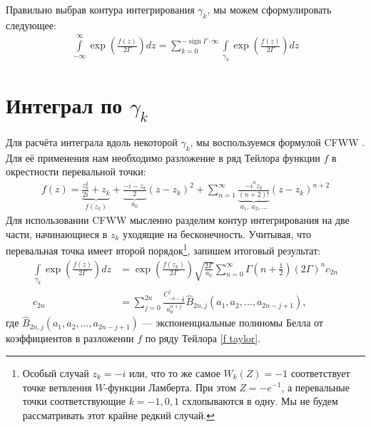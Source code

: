 \documentclass[a4paper, 12pt]{article}
\DeclareMathOperator*{\sign}{sign}
\newenvironment{eqw}{\begin{equation} \begin{aligned}}   
    {\end{aligned}    \end{equation}}
\begin{document}
Правильно выбрав контура интегрирования $\gamma_k$, мы можем сформулировать следующее:
\begin{eqw}\label{contour deformation}
    \int\limits_{-\infty}^{\infty}\exp\left(\frac{f(z)}{2\Gamma}\right) dz = \sum\limits_{k=0}^{-\sign\Gamma \cdot \infty}
    \int\limits_{\gamma_k} \exp\left(\frac{f(z)}{2\Gamma}\right) dz
\end{eqw}
\section*{Интеграл по $\gamma_k$}
Для расчёта интеграла вдоль некоторой $\gamma_k$, мы воспользуемся формулой CFWW \cite{bleistein1975asymptotic}. Для её применения нам необходимо разложение в ряд Тейлора функции $f$ в окрестности перевальной точки:
\begin{eqw}\label{f taylor}
    f(z) = \underbrace{\frac{z_k^2}{2i} + z_k}_{f(z_k)} + \underbrace{\frac{-i-z_k}{2}}_{a_0} (z-z_k)^2 + 
    \sum_{n=1}^{\infty} \underbrace{\frac{-i^n z_k}{(n+2)!}}_{a_1, \: a_2, \dots} (z-z_k)^{n+2}
\end{eqw}
Для использовании CFWW мысленно разделим контур интегрирования на две части, начинающиеся в $z_k$ уходящие на бесконечность. Учитывая, что перевальная точка имеет второй порядок\footnote{Особый случай $z_k = -i$ или, что то же самое $W_k(Z) = -1$ соответствует точке ветвления $W$-функции Ламберта. При этом $Z=-e^{-1}$, а перевальные точки соответствующие $k=-1, 0, 1$ схлопываются в одну. Мы не будем рассматривать этот крайне редкий случай.}, запишем итоговый результат:
\begin{eqw}\label{asymptotic gamma_k int raw}
    \int\limits_{\gamma_k} \exp\left(\frac{f(z)}{2\Gamma}\right) dz 
    &= \exp\left(\frac{ f(z_k)}{2\Gamma} \right)\sqrt{\frac{2\Gamma}{a_0}}\sum\limits_{n=0}^{\infty} 
    \Gamma\left(n+\frac{1}{2}\right)\left(2\Gamma\right)^n c_{2n}\\
    c_{2n} &= \sum\limits_{j=0}^{2n} \frac{C_{-n-\frac{1}{2}}^j}{a_0^{n+j}}\hat{B}_{2n, j}\left(a_1, a_2, \dots, a_{2n-j+1}\right),
\end{eqw}
где $\hat{B}_{2n, j}\left(a_1, a_2, \dots, a_{2n-j+1}\right)$ --- экспоненциальные полиномы Белла от коэффициентов в разложении  $f$ по ряду Тейлора \eqref{f taylor}. 
\end{document}
